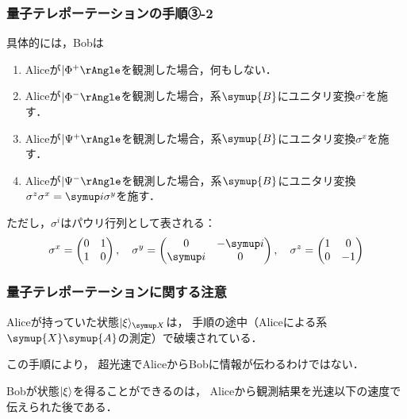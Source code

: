 \documentclass[
    10pt,
    ]{sotsu-beamer}
\begin{document}
\begin{frame}
    \frametitle{量子テレポーテーションの手順③-2}

    具体的には，Bobは
    \begin{enumerate}
        \item Aliceが$\Ket{\Phi^+}$を観測した場合，何もしない．
        \item Aliceが$\Ket{\Phi^-}$を観測した場合，系$\symup{B}$にユニタリ変換$\sigma^z$を施す．
        \item Aliceが$\Ket{\Psi^+}$を観測した場合，系$\symup{B}$にユニタリ変換$\sigma^x$を施す．
        \item Aliceが$\Ket{\Psi^-}$を観測した場合，系$\symup{B}$にユニタリ変換$\sigma^z \sigma^x = \iu \sigma^y$を施す．
    \end{enumerate}
    ただし，$\sigma^i$はパウリ行列として表される：
    \begin{equation}
        \label{eq:Pauli-matrix}
        \sigma^x = 
        \begin{pmatrix}
            0  &  1  \\
            1  &  0
        \end{pmatrix},
        \quad 
        \sigma^y = 
        \begin{pmatrix}
            0  &  -\iu  \\
            \iu  &  0  
        \end{pmatrix},
        \quad 
        \sigma^z = 
        \begin{pmatrix}
            1  &  0  \\
            0  &  -1
        \end{pmatrix}
    \end{equation}
    
\end{frame}


\begin{frame}
    \frametitle{量子テレポーテーションに関する注意}

    Aliceが持っていた状態$\ket{\xi}<X>$は，
    手順の途中（Aliceによる系$\symup{X} \symup{A}$の測定）で破壊されている．

    この手順により，
    \alert{超光速でAliceからBobに情報が伝わるわけではない}．

    Bobが状態$\ket{\xi}$を得ることができるのは，
    Aliceから観測結果を\alert{光速以下の速度で}伝えられた後である．

\end{frame}
\end{document}
